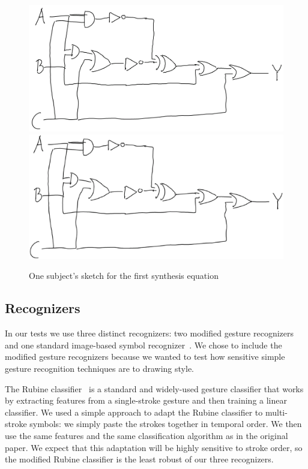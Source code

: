 \documentclass{egpubl}
\begin{document}
\begin{figure}
\ifpdf \includegraphics[width=1.0\hsize]{eqDrawing}
\else \includegraphics[width=1.0\hsize]{eqDrawing.eps} \fi
\caption{One subject's sketch for the first synthesis equation}
\label{synthFig}
\end{figure}

\subsection{Recognizers}
In our tests we use three distinct recognizers: two modified gesture recognizers\cite{rubine,dollar} and one standard 
image-based symbol recognizer~\cite{Kara2005ImageBased}.  
We chose to include the modified gesture recognizers because we wanted 
to test how sensitive simple gesture recognition techniques are to drawing style.  

The Rubine classifier~\cite{rubine} is a standard and widely-used gesture classifier that works by
extracting features from a single-stroke gesture and then training a linear classifier.  
We used a simple approach to adapt the Rubine classifier to multi-stroke symbols: we simply paste the
strokes together in temporal order.  We then use the same features and the same classification algorithm as
in the original paper.  We expect that this adaptation will be highly sensitive to stroke 
order, so the modified Rubine classifier is the least robust of our three recognizers.
\end{document}
